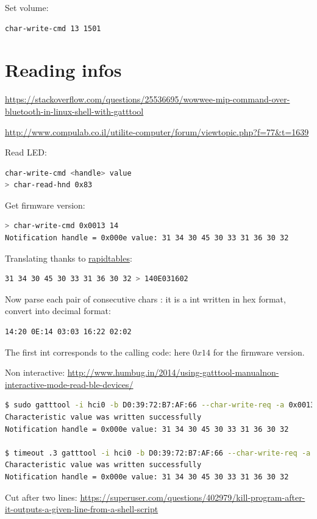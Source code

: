 \documentclass[a4paper,10pt]{article}
\newcommand{\link}[1] {\href{#1}{#1}}
\begin{document}
Set volume:
\begin{lstlisting}[language=bash]
char-write-cmd 13 1501
\end{lstlisting}


\section{Reading infos}
\link{https://stackoverflow.com/questions/25536695/wowwee-mip-command-over-bluetooth-in-linux-shell-with-gatttool}

\link{http://www.compulab.co.il/utilite-computer/forum/viewtopic.php?f=77\&t=1639}

Read LED:
\begin{lstlisting}[language=bash]
char-write-cmd <handle> value
> char-read-hnd 0x83
\end{lstlisting}

Get firmware version:
\begin{lstlisting}[language=bash]
> char-write-cmd 0x0013 14
Notification handle = 0x000e value: 31 34 30 45 30 33 31 36 30 32
\end{lstlisting}
Translating thanks to 
\href{http://www.rapidtables.com/convert/number/hex-to-ascii.htm}{rapidtables}:
\begin{lstlisting}[language=bash]
31 34 30 45 30 33 31 36 30 32 > 140E031602
\end{lstlisting}
Now parse each pair of consecutive chars : 
it is a int written in hex format, convert into decimal format:
\begin{lstlisting}[language=bash]
14:20 0E:14 03:03 16:22 02:02
\end{lstlisting}
The first int corresponds to the calling code: here $0x14$ for the firmware version.


Non interactive:
\link{http://www.humbug.in/2014/using-gatttool-manualnon-interactive-mode-read-ble-devices/} 

\begin{lstlisting}[language=bash]
$ sudo gatttool -i hci0 -b D0:39:72:B7:AF:66 --char-write-req -a 0x0013 -n 14 --listen
Characteristic value was written successfully
Notification handle = 0x000e value: 31 34 30 45 30 33 31 36 30 32

$ timeout .3 gatttool -i hci0 -b D0:39:72:B7:AF:66 --char-write-req -a 0x0013 -n 14 --listen
Characteristic value was written successfully
Notification handle = 0x000e value: 31 34 30 45 30 33 31 36 30 32 
\end{lstlisting}

Cut after two lines:
\link{https://superuser.com/questions/402979/kill-program-after-it-outputs-a-given-line-from-a-shell-script}
\end{document}
